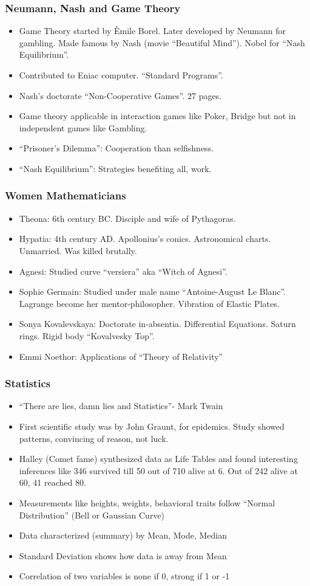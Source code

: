 \begin{frame}[fragile]
\frametitle{Neumann, Nash and Game Theory}
\begin{itemize}
\item  Game Theory started by \`Emile Borel. Later developed by Neumann for gambling. Made famous by Nash (movie ``Beautiful Mind''). Nobel for ``Nash Equilibrium''.
\item Contributed to Eniac computer. ``Standard Programs''.
\item Nash's doctorate ``Non-Cooperative Games''. 27 pages.
\item Game theory applicable in interaction games like Poker, Bridge but not in independent games like Gambling.
\item ``Prisoner's Dilemma'': Cooperation than selfishness.
\item ``Nash Equilibrium'': Strategies benefiting all, work.
\end{itemize}
\end{frame}

\begin{frame}[fragile]
\frametitle{Women Mathematicians}
\begin{itemize}
\item Theona: 6th century BC. Disciple and wife of Pythagoras. 
\item Hypatia: 4th century AD. Apollonius's conics. Astronomical charts.  Unmarried. Was killed brutally.
\item Agnesi: Studied curve ``versiera'' aka ``Witch of Agnesi''.
\item Sophie Germain: Studied under male name ``Antoine-August Le Blanc''. Lagrange become her mentor-philosopher. Vibration of Elastic Plates.
\item Sonya Kovalevskaya: Doctorate in-absentia. Differential Equations. Saturn rings. Rigid body ``Kovalvesky Top''.
\item Emmi Noethor: Applications of ``Theory of Relativity''
\end{itemize}
\end{frame}

\begin{frame}[fragile]
\frametitle{Statistics}
\begin{itemize}
\item ``There are lies, damn lies and Statistics''- Mark Twain
\item First scientific study was by John Graunt, for epidemics. Study showed patterns, convincing of reason, not luck.
\item Halley (Comet fame) synthesized data as Life Tables and found interesting inferences like 346 survived till 50 out of 710 alive at 6. Out of 242 alive at 60, 41 reached 80.
\item Measurements like heights, weights, behavioral traits follow ``Normal Distribution'' (Bell or Gaussian Curve)
\item Data characterized (summary) by Mean, Mode, Median
\item Standard Deviation shows how data is away from Mean
\item Correlation of two variables is none if 0, strong if 1 or -1
\end{itemize}
\end{frame}

